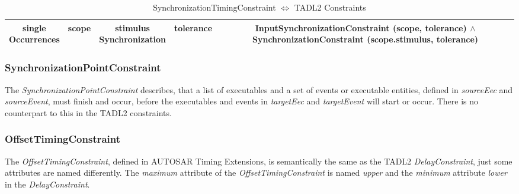 \begin{table}
\begin{tabular}{|c|c|c|c|c|}
				\hline
				\makecell{single\\Occurrences}  & scope & \makecell{stimulus\\Synchronization} & tolerance & \makecell{InputSynchronizationConstraint\\\hspace{.5cm}(scope, tolerance)\\ $\land$ SynchronizationConstraint\\\hspace{.5cm}(scope.stimulus, tolerance)}\\
				\hline
			\end{tabular}
			\caption{SynchronizationTimingConstraint $\Leftrightarrow$ TADL2 Constraints}
			\label{ComparisonSynchronizationConstraints}
		\end{table}
	
	\subsubsection{SynchronizationPointConstraint}
		The \emph{SynchronizationPointConstraint} describes, that a list of executables and a set of events or executable entities, defined in \emph{sourceEec} and \emph{sourceEvent},  must finish and occur, before the executables and events in \emph{targetEec} and \emph{targetEvent} will start or occur. There is no counterpart to this in the TADL2 constraints.
		
	\subsubsection{OffsetTimingConstraint}
		The \emph{OffsetTimingConstraint}, defined in AUTOSAR Timing Extensions, is semantically the same as the TADL2 \emph{DelayConstraint}, just some attributes are named differently. The \emph{maximum} attribute of the \emph{OffsetTimingConstraint} is named \emph{upper} and the \emph{minimum} attribute \emph{lower} in the \emph{DelayConstraint}.
		
